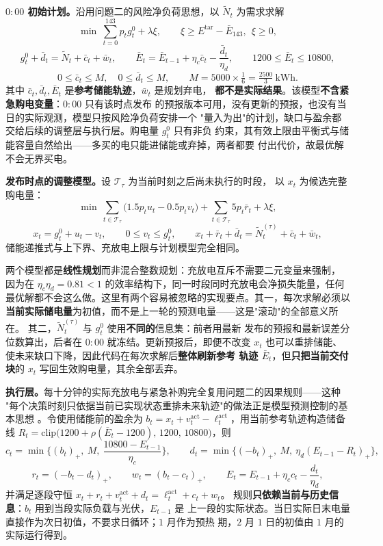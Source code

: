 \textbf{$0{:}00$ 初始计划。}沿用问题二的风险净负荷思想，以
$\widetilde N_t$ 为需求求解
$$
\min\ \sum_{t=0}^{143}p_tg_t^0+\lambda\xi ,
\qquad \xi\ge E^{\mathrm{tar}}-\bar E_{143},\ \ \xi\ge0 ,
$$
$$
g_t^0+\bar d_t=\widetilde N_t+\bar c_t+\bar w_t ,
\qquad
\bar E_t=\bar E_{t-1}+\eta_c\bar c_t-\frac{\bar d_t}{\eta_d} ,
\qquad
1200\le\bar E_t\le10800 ,
$$
$$
0\le\bar c_t\le M,\quad 0\le\bar d_t\le M ,
\qquad M=5000\times\tfrac16=\tfrac{2500}{3}\ \mathrm{kWh}.
$$
其中 $\bar c_t,\bar d_t,\bar E_t$ 是\textbf{参考储能轨迹}，$\bar w_t$ 是规划弃电，
\textbf{都不是实际结果}。该模型\textbf{不含紧急购电变量}：$0{:}00$ 只有该时点发布
的预报版本可用，没有更新的预报，也没有当日的实际观测，模型只按风险净负荷安排一个
"量入为出"的计划，缺口与盈余都交给后续的调整层与执行层。购电量 $g_t^0$ 只有非负
约束，其有效上限由平衡式与储能容量自然给出——多买的电只能进储能或弃掉，两者都要
付出代价，故最优解不会无界买电。

\textbf{发布时点的调整模型。}设 $\mathcal T_\tau$ 为当前时刻之后尚未执行的时段，
以 $x_t$ 为候选完整购电量：
$$
\min\ \sum_{t\in\mathcal T_\tau}\big(1.5p_tu_t-0.5p_tv_t\big)
+\sum_{t\in\mathcal T_\tau}5p_t\bar r_t+\lambda\xi ,
$$
$$
x_t=g_t^0+u_t-v_t ,\qquad 0\le v_t\le g_t^0 ,
\qquad
x_t+\bar r_t+\bar d_t=\widetilde N_t^{(\tau)}+\bar c_t+\bar w_t ,
$$
储能递推式与上下界、充放电上限与计划模型完全相同。

两个模型都是\textbf{线性规划}而非混合整数规划：充放电互斥不需要二元变量来强制，
因为在 $\eta_c\eta_d=0.81<1$ 的效率结构下，同一时段同时充放电会净损失能量，任何
最优解都不会这么做。这里有两个容易被忽略的实现要点。其一，每次求解必须以
\textbf{当前实际储电量}为初值，而不是上一轮的预测电量——这是"滚动"的全部意义所在。
其二，$\widetilde N_t^{(\tau)}$ 与 $g_t^0$ 使用\textbf{不同的}信息集：前者用最新
发布的预报和最新误差分位数算出，后者在 $0{:}00$ 就冻结。更新预报后，即便不改变
$x_t$ 也可以重排储能、使未来缺口下降，因此代码在每次求解后\textbf{整体刷新参考
轨迹 $\bar E_t$}，但\textbf{只把当前交付块}的 $x_t$ 写回生效购电量，其余全部丢弃。

\textbf{执行层。}每十分钟的实际充放电与紧急补购完全复用问题二的因果规则——这种
"每个决策时刻只依据当前已实现状态重排未来轨迹"的做法正是模型预测控制的基本思想
\cite{ref:mpc}。令使用储能前的盈余为
$b_t=x_t+v_t^{\mathrm{act}}-\ell_t^{\mathrm{act}}$，用当前参考轨迹构造储备线
$R_t=\mathrm{clip}\big(1200+\rho(\bar E_t-1200),\,1200,\,10800\big)$，则
$$
c_t=\min\Big\{(b_t)_+,\ M,\ \frac{10800-E_{t-1}}{\eta_c}\Big\},
\qquad
d_t=\min\Big\{(-b_t)_+,\ M,\ \eta_d(E_{t-1}-R_t)_+\Big\},
$$
$$
r_t=(-b_t-d_t)_+ ,\qquad w_t=(b_t-c_t)_+ ,\qquad
E_t=E_{t-1}+\eta_cc_t-\frac{d_t}{\eta_d},
$$
并满足逐段守恒 $x_t+r_t+v_t^{\mathrm{act}}+d_t=\ell_t^{\mathrm{act}}+c_t+w_t$。
规则\textbf{只依赖当前与历史信息}：$b_t$ 用到当段实际负载与光伏，$E_{t-1}$ 是
上一段的实际状态。当日实际日末电量直接作为次日初值，不要求日循环；$1$ 月作为预热
期，$2$ 月 $1$ 日的初值由 $1$ 月的实际运行得到。

